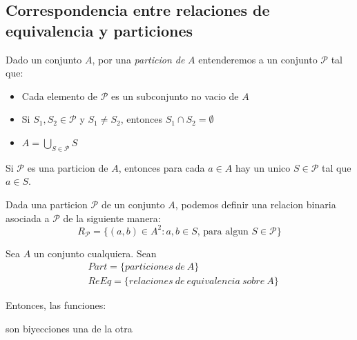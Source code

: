 \subsection{Correspondencia entre relaciones de equivalencia y particiones}
\begin{definition}
  Dado un conjunto $A$, por una \emph{particion de } $A$ entenderemos a un conjunto $\mathcal{P}$ tal que:
  \begin{itemize}
    \item Cada elemento de $\mathcal{P}$ es un subconjunto no vacio de $A$
    \item Si $S_1, S_2 \in \mathcal{P}$ y $S_1 \neq S_2$, entonces $S_1 \cap S_2 = \emptyset$
    \item $A = \bigcup_{S \in \mathcal{P}}S$
  \end{itemize}
\end{definition}
\begin{remark}
  Si $\mathcal{P}$ es una particion de $A$, entonces para cada $a \in A$ hay un unico $S \in \mathcal{P}$
  tal que $a \in S$.
\end{remark}
\begin{definition}
  Dada una particion $\mathcal{P}$ de un conjunto $A$, podemos definir una relacion binaria
  asociada a $\mathcal{P}$ de la siguiente manera:
  $$
  R_\mathcal{P} = \{(a, b) \in A^2 : a, b \in S\text{, para algun }S \in \mathcal{P}\}
  $$
\end{definition}

\begin{theorem}
  Sea $A$ un conjunto cualquiera. Sean
  \begin{equation*}\begin{split}
      &Part = \{particiones\ de\ A\}\\
      &ReEq = \{relaciones\ de\ equivalencia\ sobre\ A\}
  \end{split}\end{equation*}
  
  Entonces, las funciones:

  son biyecciones una de la otra
\end{theorem}

\noproof


